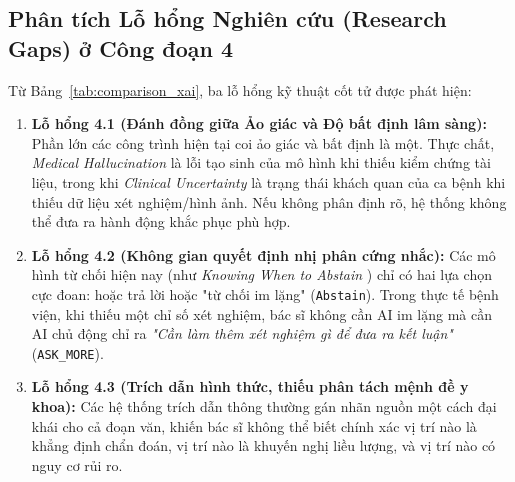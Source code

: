 \clearpage
\subsection{Phân tích Lỗ hổng Nghiên cứu (Research Gaps) ở Công đoạn 4}
Từ Bảng~\ref{tab:comparison_xai}, ba lỗ hổng kỹ thuật cốt tử được phát hiện:
\begin{enumerate}
    \item \textbf{Lỗ hổng 4.1 (Đánh đồng giữa Ảo giác và Độ bất định lâm sàng):} Phần lớn các công trình hiện tại coi ảo giác và bất định là một. Thực chất, \emph{Medical Hallucination} là lỗi tạo sinh của mô hình khi thiếu kiểm chứng tài liệu, trong khi \emph{Clinical Uncertainty} là trạng thái khách quan của ca bệnh khi thiếu dữ liệu xét nghiệm/hình ảnh. Nếu không phân định rõ, hệ thống không thể đưa ra hành động khắc phục phù hợp.
    \item \textbf{Lỗ hổng 4.2 (Không gian quyết định nhị phân cứng nhắc):} Các mô hình từ chối hiện nay (như \emph{Knowing When to Abstain} \cite{knowing_when_abstain_2026}) chỉ có hai lựa chọn cực đoan: hoặc trả lời hoặc "từ chối im lặng" (\texttt{Abstain}). Trong thực tế bệnh viện, khi thiếu một chỉ số xét nghiệm, bác sĩ không cần AI im lặng mà cần AI chủ động chỉ ra \emph{"Cần làm thêm xét nghiệm gì để đưa ra kết luận"} (\texttt{ASK\_MORE}).
    \item \textbf{Lỗ hổng 4.3 (Trích dẫn hình thức, thiếu phân tách mệnh đề y khoa):} Các hệ thống trích dẫn thông thường gán nhãn nguồn một cách đại khái cho cả đoạn văn, khiến bác sĩ không thể biết chính xác vị trí nào là khẳng định chẩn đoán, vị trí nào là khuyến nghị liều lượng, và vị trí nào có nguy cơ rủi ro.
\end{enumerate}

